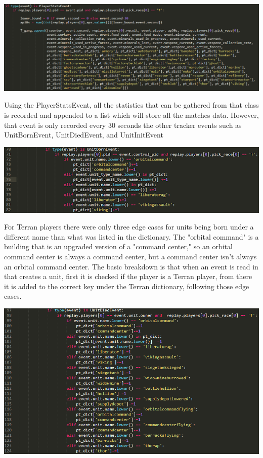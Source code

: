 \documentclass[a4paper,12pt]{report}
\begin{document}
\begin{center}
    \captionsetup{type=figure}
    \includegraphics[width=.9\linewidth]{media/TerranStatspystart.png}
\end{center}

Using the PlayerStatsEvent, all the statistics that can be gathered from that class is recorded and appended to a list which will store all the matches data. However, that event is only recorded every 30 seconds the other tracker events such as UnitBornEvent, UnitDiedEvent, and UnitInitEvent 

\begin{center}
    \captionsetup{type=figure}
    \includegraphics[width=.9\linewidth]{media/UnitBornDiedInit.png}
\end{center}

For Terran players there were only three edge cases for units being born under a different name than what was listed in the dictionary. The "orbital command" is a building that is an upgraded version of a "command center," so an orbital command center is always a command center, but a command center isn’t always an orbital command center. The basic breakdown is that when an event is read in that creates a unit, first it is checked if the player is a Terran player, from there it is added to the correct key under the Terran dictionary, following those edge cases.

\begin{center}
    \captionsetup{type=figure}
    \includegraphics[width=.9\linewidth]{media/EdgeCases.png}
\end{center}
\end{document}
